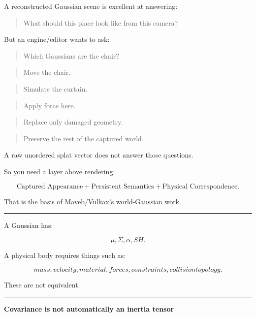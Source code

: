 A reconstructed Gaussian scene is excellent at answering:

\begin{quote}
What should this place look like from this camera?
\end{quote}

But an engine/editor wants to ask:

\begin{quote}
Which Gaussians are the chair?
\end{quote}

\begin{quote}
Move the chair.
\end{quote}

\begin{quote}
Simulate the curtain.
\end{quote}

\begin{quote}
Apply force here.
\end{quote}

\begin{quote}
Replace only damaged geometry.
\end{quote}

\begin{quote}
Preserve the rest of the captured world.
\end{quote}

A raw unordered splat vector does not answer those questions.

So you need a layer above rendering:

\[
\boxed{
\text{Captured Appearance}
+
\text{Persistent Semantics}
+
\text{Physical Correspondence}.
}
\]

That is the basis of Maveb/Vulkax's world-Gaussian work.

\begin{center}\rule{0.5\linewidth}{0.5pt}\end{center}

A Gaussian has:

\[
\mu,
\Sigma,
\alpha,
SH.
\]

A physical body requires things such as:

\[
mass,
velocity,
material,
forces,
constraints,
collision topology.
\]

These are not equivalent.

\begin{center}\rule{0.5\linewidth}{0.5pt}\end{center}

\textbf{Covariance is not automatically an inertia tensor}

